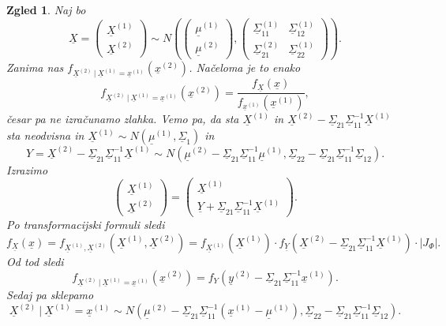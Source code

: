 \documentclass[10pt, a4paper]{article}
\newtheorem{zgled}[izr]{Zgled}
\begin{document}
\begin{zgled}
  Naj bo $$\underline{X} = \begin{pmatrix}
    \underline{X}^{(1)}\\
    \underline{X}^{(2)}
  \end{pmatrix} \sim N\left(\begin{pmatrix}
    \underline{\mu}^{(1)}\\
    \underline{\mu}^{(2)}
  \end{pmatrix}, 
  \begin{pmatrix}
    \underline{\Sigma}_{11}^{(1)} & \underline{\Sigma}_{12}^{(1)}\\
    \underline{\Sigma}_{21}^{(2)} & \underline{\Sigma}_{22}^{(1)}
  \end{pmatrix}\right).$$
  Zanima nas $f_{\underline{X}^{(2)}\ |\ \underline{X}^{(1)} = \underline{x}^{(1)}} (\underline{x}^{(2)})$.
  Načeloma je to enako  
 $$f_{\underline{X}^{(2)}\ |\ \underline{X}^{(1)} = \underline{x}^{(1)}} (\underline{x}^{(2)}) = \frac{f_{\underline{X}} (\underline{x})}{f_{\underline{x}^{(1)}} (\underline{x}^{(1)})},$$
 česar pa ne izračunamo zlahka.
 Vemo pa, da sta $\underline{X}^{(1)}$ in $\underline{X}^{(2)} - \underline{\Sigma}_{21} \underline{\Sigma}_{11} ^{-1} \underline{X}^{(1)}$
 sta neodvisna in $\underline{X} ^{(1)} \sim N (\underline{\mu}^{(1)}, \underline{\Sigma}_{1})$ in 
 $$Y = \underline{X}^{(2)} - \underline{\Sigma}_{21} \underline{\Sigma}_{11} ^{-1} \underline{X}^{(1)} \sim N(\underline{\mu}^{(2)} - \underline{\Sigma}_{21} \underline{\Sigma}_{11} ^{-1} \underline{\mu}^{(1)}, \underline{\Sigma}_{22} - \underline{\Sigma}_{21} \underline{\Sigma}_{11} ^{-1} \underline{\Sigma}_{12}).$$
 Izrazimo 
 $$\begin{pmatrix}
  \underline{X}^{(1)}\\
  \underline{X}^{(2)}
\end{pmatrix} = \begin{pmatrix}
  \underline{X}^{(1)}\\
  \underline{Y} + \underline{\Sigma}_{21} \underline{\Sigma}_{11} ^{-1} \underline{X}^{(1)}
\end{pmatrix}.$$
Po transformacijski formuli sledi 
$$f_{\underline{X}} (\underline{x}) = f_{\underline{X}^{(1)}, \underline{X}^{(2)}} (\underline{X}^{(1)}, \underline{X}^{(2)}) = f_{\underline{X}^{(1)}} (\underline{X}^{(1)}) \cdot f_{\underline{Y}} (\underline{X}^{(2)} - \underline{\Sigma}_{21} \underline{\Sigma}_{11} ^{-1} \underline{X}^{(1)}) \cdot |J_{\Phi}|.$$
Od tod sledi 
$$f_{\underline{X}^{(2)}\ |\ \underline{X}^(1) = \underline{x}^{(1)}} (\underline{x}^{(2)}) = f_Y (\underline{y}^{(2)} - \underline{\Sigma}_{21} \underline{\Sigma}_{11} ^{-1} \underline{x}^{(1)}).$$
Sedaj pa sklepamo 
$$\underline{X}^{(2)}\ |\ \underline{X}^{(1)} = \underline{x}^{(1)} \sim N(\underline{\mu}^{(2)} - \underline{\Sigma}_{21} \underline{\Sigma}_{11}^{-1} (\underline{x}^{(1)} - \underline{\mu}^{(1)}), \underline{\Sigma}_{22} - \underline{\Sigma}_{21} \underline{\Sigma}_{11} ^{-1} \underline{\Sigma}_{12}).$$
\end{zgled}
\end{document}
